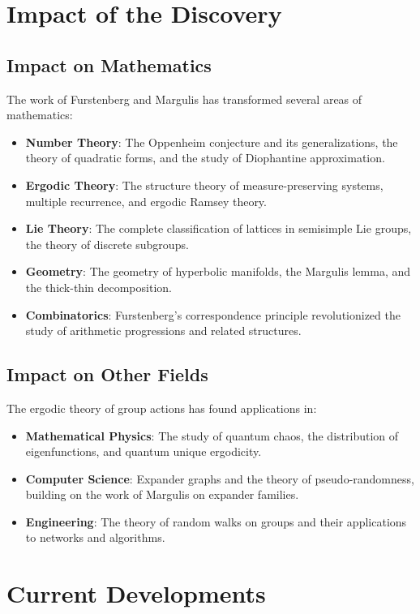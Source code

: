 \section{Impact of the Discovery}

\subsection{Impact on Mathematics}

The work of Furstenberg and Margulis has transformed several areas of mathematics:

\begin{itemize}
\item \textbf{Number Theory}: The Oppenheim conjecture and its generalizations, the theory of quadratic forms, and the study of Diophantine approximation.
\item \textbf{Ergodic Theory}: The structure theory of measure-preserving systems, multiple recurrence, and ergodic Ramsey theory.
\item \textbf{Lie Theory}: The complete classification of lattices in semisimple Lie groups, the theory of discrete subgroups.
\item \textbf{Geometry}: The geometry of hyperbolic manifolds, the Margulis lemma, and the thick-thin decomposition.
\item \textbf{Combinatorics}: Furstenberg's correspondence principle revolutionized the study of arithmetic progressions and related structures.
\end{itemize}

\subsection{Impact on Other Fields}

The ergodic theory of group actions has found applications in:
\begin{itemize}
\item \textbf{Mathematical Physics}: The study of quantum chaos, the distribution of eigenfunctions, and quantum unique ergodicity.
\item \textbf{Computer Science}: Expander graphs and the theory of pseudo-randomness, building on the work of Margulis on expander families.
\item \textbf{Engineering}: The theory of random walks on groups and their applications to networks and algorithms.
\end{itemize}

\section{Current Developments}

